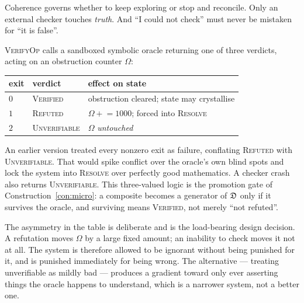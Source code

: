 \begin{intu}\Intu
Coherence governs whether to keep exploring or stop and reconcile. Only
an external checker touches \emph{truth}. And ``I could not check'' must
never be mistaken for ``it is false''.
\end{intu}

\begin{definition}\label{def:verify}
\textsc{VerifyOp} calls a sandboxed symbolic oracle returning one of
three verdicts, acting on an obstruction counter $\Omega$:
\begin{center}
\renewcommand{\arraystretch}{1.25}
\begin{tabular}{@{}lll@{}}
\toprule
exit & verdict & effect on state\\
\midrule
$0$ & \textsc{Verified} & obstruction cleared; state may crystallise\\
$1$ & \textsc{Refuted} & $\Omega\mathrel{+}=1000$; forced into \textsc{Resolve}\\
$2$ & \textsc{Unverifiable} & $\Omega$ \emph{untouched}\\
\bottomrule
\end{tabular}
\end{center}
\end{definition}

\begin{remark}\label{rem:threevalued}
An earlier version treated every nonzero exit as failure, conflating
\textsc{Refuted} with \textsc{Unverifiable}. That would spike conflict
over the oracle's own blind spots and lock the system into
\textsc{Resolve} over perfectly good mathematics. A checker crash also
returns \textsc{Unverifiable}. This three-valued logic is the promotion
gate of Construction~\ref{con:micro}: a composite becomes a generator of
$\mathfrak{D}$ only if it survives the oracle, and surviving means
\textsc{Verified}, not merely ``not refuted''.
\end{remark}

\begin{hon}\Hon
The asymmetry in the table is deliberate and is the load-bearing design
decision. A refutation moves $\Omega$ by a large fixed amount; an
inability to check moves it not at all. The system is therefore allowed
to be ignorant without being punished for it, and is punished
immediately for being wrong. The alternative --- treating unverifiable
as mildly bad --- produces a gradient toward only ever asserting things
the oracle happens to understand, which is a narrower system, not a
better one.
\end{hon}

